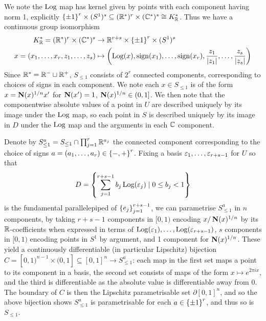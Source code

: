 \documentclass[11pt]{report}
\begin{document}
We note the $\operatorname{Log}$ map has kernel given by points with each component having norm 1, explicitly $\left\{  \pm 1  \right\}^r \times (S^1)^s \subseteq (\mathbb{R}^*)^r \times (\mathbb{C}^*)^s \cong K_{\mathbb{R}}^*$. Thus we have a continuous group isomorphism
\begin{align}
    K_{\mathbb{R}}^* = (\mathbb{R}^*)^r \times (\mathbb{C}^*)^s &\to \mathbb{R}^{r + s} \times \left\{  \pm 1  \right\}^r \times (S^1)^s \nonumber \\
    x = (x_1, \ldots, x_r, z_1, \ldots, z_s) &\mapsto \left(  \operatorname{Log}(x), \operatorname{sign}(x_1), \ldots, \operatorname{sign}(x_r), \frac{z_1}{\left| z_1 \right|}, \ldots, \frac{z_s}{\left| z_s \right|}  \right)\label{contgpiso}
\end{align}
Since $\mathbb{R}^* = \mathbb{R}^- \sqcup \mathbb{R}^+$, $S_{\leq 1}$ consists of $2^r$ connected components, corresponding to choices of signs in each component. We note each $x \in S_{\leq 1}$ is of the form $x = \operatorname{\mathbf{N}}(x)^{1/n}x'$ for $\operatorname{\mathbf{N}}(x') = 1$, $\operatorname{\mathbf{N}}(x)^{1/n} \in (0, 1]$. We then note that the componentwise absolute values of a point in $U$ are described uniquely by its image under the $\operatorname{Log}$ map, so each point in $S$ is described uniquely by its image in $D$ under the $\operatorname{Log}$ map and the arguments in each $\mathbb{C}$ component. 

Denote by $S_{\leq 1}^a = S_{\leq 1} \cap \prod_{j = 1}^r\mathbb{R}^{a_j}$ the connected component corresponding to the choice of signs $a = (a_1, \ldots, a_r) \in \left\{  -, +  \right\}^r$. Fixing a basis $\varepsilon_1, \ldots, \varepsilon_{r + s - 1}$ for $U$ so that 
$$
    D = \left\{  \sum_{j = 1}^{r + s - 1} b_j\operatorname{Log}(\varepsilon_j) \mid 0 \leq b_j < 1  \right\}
$$
is the fundamental parallelepiped of $\left\{  e_j  \right\}_{j = 1}^{r + s - 1}$, we can parametrise $S_{\leq 1}^a$ in $n$ components, by taking $r + s - 1$ components in $[0, 1)$ encoding $x/\operatorname{\mathbf{N}}(x)^{1/n}$ by its $\mathbb{R}$-coefficients when expressed in terms of $\operatorname{Log}(\varepsilon_1), \ldots, \operatorname{Log}(\varepsilon_{r + s - 1})$, $s$ components in $[0, 1)$ encoding points in $S^1$ by argument, and 1 component for $\operatorname{\mathbf{N}}(x)^{1/n}$. These yield a continuously differentiable (in particular Lipschitz) bijection $C = [0, 1)^{n - 1} \times (0, 1] \subseteq [0, 1]^n \to S_{\leq 1}^a$: each map in the first set maps a point to its component in a basis, the second set consists of maps of the form $x \mapsto e^{2\pi i x}$, and the third is differentiable as the absolute value is differentiable away from $0$. The boundary of $C$ is then the Lipschitz parametrisable set $\partial [0, 1]^n$, and so the above bijection shows $S_{\leq 1}^a$ is parametrisable for each $a \in \left\{  \pm 1  \right\}^r$, and thus so is $S_{\leq 1}$.
\end{document}
